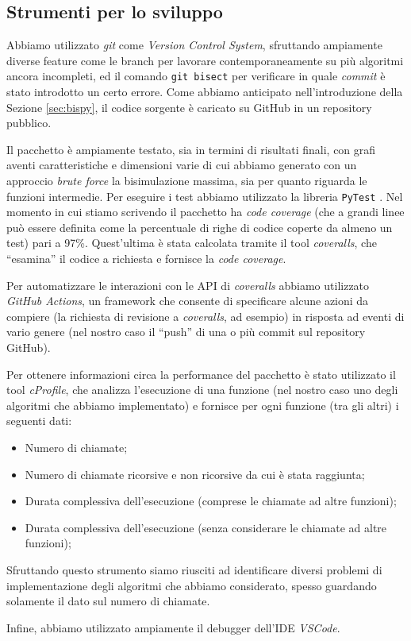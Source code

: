 \subsection{Strumenti per lo sviluppo}
Abbiamo utilizzato \emph{git} come \emph{Version Control System}, sfruttando ampiamente diverse feature come le branch per lavorare contemporaneamente su più algoritmi ancora incompleti, ed il comando \verb|git bisect| per verificare in quale \emph{commit} è stato introdotto un certo errore. Come abbiamo anticipato nell'introduzione della Sezione \ref{sec:bispy}, il codice sorgente è caricato su GitHub in un repository pubblico.

Il pacchetto è ampiamente testato, sia in termini di risultati finali, con grafi aventi caratteristiche e dimensioni varie di cui abbiamo generato con un approccio \emph{brute force} la bisimulazione massima, sia per quanto riguarda le funzioni intermedie. Per eseguire i test abbiamo utilizzato la libreria \texttt{PyTest} \cite{pytest}. Nel momento in cui stiamo scrivendo il pacchetto ha \emph{code coverage} (che a grandi linee può essere definita come la percentuale di righe di codice coperte da almeno un test) pari a 97\%. Quest'ultima è stata calcolata tramite il tool \emph{coveralls}, che ``esamina'' il codice a richiesta e fornisce la \emph{code coverage}.

Per automatizzare le interazioni con le API di \emph{coveralls} abbiamo utilizzato \emph{GitHub Actions}, un framework che consente di specificare alcune azioni da compiere (la richiesta di revisione a \emph{coveralls}, ad esempio) in risposta ad eventi di vario genere (nel nostro caso il ``push'' di una o più commit sul repository GitHub).

Per ottenere informazioni circa la performance del pacchetto è stato utilizzato il tool \emph{cProfile}, che analizza l'esecuzione di una funzione (nel nostro caso uno degli algoritmi che abbiamo implementato) e fornisce per ogni funzione (tra gli altri) i seguenti dati:
\begin{itemize}
    \item Numero di chiamate;
    \item Numero di chiamate ricorsive e non ricorsive da cui è stata raggiunta;
    \item Durata complessiva dell'esecuzione (comprese le chiamate ad altre funzioni);
    \item Durata complessiva dell'esecuzione (senza considerare le chiamate ad altre funzioni);
\end{itemize}
Sfruttando questo strumento siamo riusciti ad identificare diversi problemi di implementazione degli algoritmi che abbiamo considerato, spesso guardando solamente il dato sul numero di chiamate.

Infine, abbiamo utilizzato ampiamente il debugger dell'IDE \emph{VSCode}.
